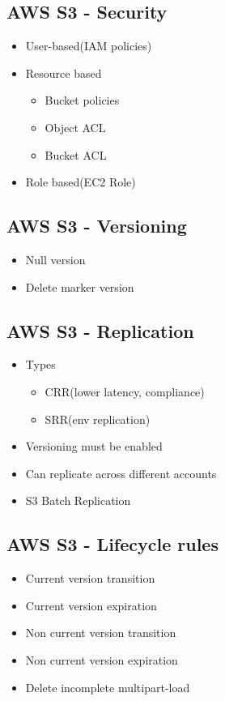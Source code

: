 \documentclass[../../main.tex]{subfiles}
\begin{document}
\subsection{AWS S3 - Security}
\begin{itemize}
    \item User-based(IAM policies)
    \item Resource based
    \begin{itemize}
        \item Bucket policies
        \item Object ACL
        \item Bucket ACL
    \end{itemize}
    \item Role based(EC2 Role)
\end{itemize}

\subsection{AWS S3 - Versioning}
\begin{itemize}
    \item Null version
    \item Delete marker version
\end{itemize}

\subsection{AWS S3 - Replication}
\begin{itemize}
    \item Types
    \begin{itemize}
        \item CRR(lower latency, compliance)
        \item SRR(env replication)
    \end{itemize}
    \item Versioning must be enabled
    \item Can replicate across different accounts
    \item S3 Batch Replication
\end{itemize}

\subsection{AWS S3 - Lifecycle rules}
\begin{itemize}
    \item Current version transition
    \item Current version expiration
    \item Non current version transition
    \item Non current version expiration
    \item Delete incomplete multipart-load
\end{itemize}
\end{document}

